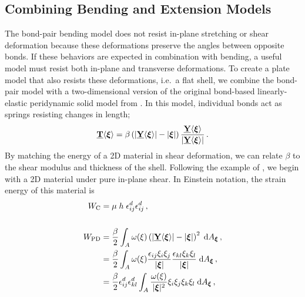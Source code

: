 \subsection{Combining Bending and Extension Models}
The bond-pair bending model does not resist in-plane stretching or shear deformation because these deformations preserve the angles between opposite bonds.  If these behaviors are expected in combination with bending, a useful model must resist both in-plane and transverse deformations.  To create a plate model that also resists these deformations, i.e.\ a flat shell, we combine the bond-pair model with a two-dimensional version of the original bond-based linearly-elastic peridynamic solid model from \cite{silling2000reformulation}.  In this model, individual bonds act as springs resisting changes in length;
%
\begin{equation}
    \label{eq:bondextension}
    \vstate{T}{}{\boldsymbol{\xi}} =\beta\left(|\vstate{Y}{}{\boldsymbol{\xi}}|-|\boldsymbol{\xi}|\right)\frac{\vstate{Y}{}{\boldsymbol{\xi}}}{|\vstate{Y}{}{\boldsymbol{\xi}}|}\, .
\end{equation}
%
By matching the energy of a 2D material in shear deformation, we can relate \(\beta\) to the shear modulus and thickness of the shell.  Following the example of \cite{silling2007peridynamic}, we begin with a 2D material under pure in-plane shear.  In Einstein notation, the strain energy of this material is
%
%
\begin{align*}
    W_\text{C} &= \mu \; h \; \epsilon_{ij}^d \epsilon_{ij}^d\, ,  \\  \\
    W_\text{PD} &= \frac{\beta}{2}\int_A \omega(\xi)\left(|\vstate{Y}{}{\boldsymbol{\xi}}|-|\boldsymbol{\xi}|\right)^2 \; {\rm d}A_{\boldsymbol{\xi}}\, , \\
    &=\frac{\beta}{2}\int_A  \omega(\xi) \frac{\epsilon_{ij}\xi_i \xi_j }{|\boldsymbol{\xi}|} \frac{\epsilon_{kl} \xi_k \xi_l }{|\boldsymbol{\xi}|}\;{\rm d}A_{\boldsymbol{\xi}}\, ,\\
    &=\frac{\beta}{2} \epsilon_{ij}^d \epsilon_{kl}^d \int_A \frac{ \omega(\xi)}{|\boldsymbol{\xi}|^2}\xi_i \xi_j \xi_k \xi_l \;{\rm d}A_{\boldsymbol{\xi}}\, ,
\end{align*}
